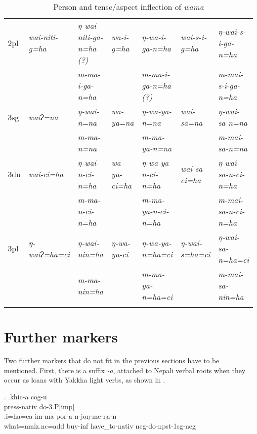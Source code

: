 \begin{sidewaystable}
{\begin{tabular}{lllllll}
{\sc 2pl} & \it  wai-niti-g=ha & \it  ŋ-wai-niti-ga-n=ha (?)& \it  wa-i-g=ha	 & \it  ŋ-wa-i-ga-n=ha & \it  wai-s-i-g=ha & \it   ŋ-wai-s-i-ga-n=ha\\
 & \it   & \it  m-ma-i-ga-n=ha & \it   & \it  m-ma-i-ga-n=ha (?) & \it   & \it  m-mai-s-i-ga-n=ha\\
\midrule
{\sc 3sg} & \it   waiʔ=na	 & \it  ŋ-wai-n=na & \it  wa-ya=na	& \it  ŋ-wa-ya-n=na & \it  wai-sa=na & \it   ŋ-wai-sa-n=na\\
 & \it   & \it  m-ma-n=na & \it   & \it  m-ma-ya-n=na & \it   & \it  m-mai-sa-n=na\\
{\sc 3du} & \it  wai-ci=ha & \it  ŋ-wai-n-ci-n=ha	 & \it  wa-ya-ci=ha & \it  ŋ-wa-ya-n-ci-n=ha & \it  wai-sa-ci=ha & \it  ŋ-wai-sa-n-ci-n=ha\\
 & \it   & \it  m-ma-n-ci-n=ha & \it   & \it  m-ma-ya-n-ci-n=ha & \it   & \it  m-mai-sa-n-ci-n=ha\\
{\sc 3pl} & \it   ŋ-waiʔ=ha=ci & \it  ŋ-wai-nin=ha & \it  ŋ-wa-ya-ci & \it  ŋ-wa-ya-n=ha=ci & \it  ŋ-wai-s=ha=ci & \it  ŋ-wai-sa-n=ha=ci \\
 & \it   & \it  m-ma-nin=ha & \it   & \it  m-ma-ya-n=ha=ci & \it   & \it  m-mai-sa-nin=ha\\
\lspbottomrule
\end{tabular}
}
\caption{Person and tense/aspect inflection of  \emph{wama} }\label{par-wa-ma}
\end{sidewaystable}




\section{Further markers}\label{furtherverbal}

Two further markers that do not fit in the previous sections have to be mentioned. First, there is a suffix \emph{-a}, attached to Nepali verbal roots when they occur as loans with Yakkha light verbs, as shown in \Next.

\ex. \ag.khic-a cog-u\\
press{\sc -nativ} do{\sc -3.P[imp]}\\
\bg.i=ha=ca im-ma por-a n-joŋ-me-ŋa-n\\
what{\sc =nmlz.nc=add} buy{\sc -inf} have\_to{\sc -nativ} {\sc neg-}do{\sc -npst-1sg-neg}\\
 

